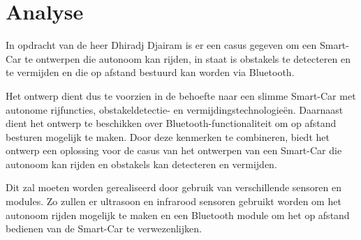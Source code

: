 \section{Analyse}
In opdracht van de heer Dhiradj Djairam is er een casus gegeven om een \gls{Smart-Car} te ontwerpen die \gls{autonoom} kan rijden, in staat is obstakels te detecteren en te vermijden en die op afstand bestuurd kan worden via \gls{Bluetooth}. 

Het ontwerp dient dus te voorzien in de behoefte naar een slimme \gls{Smart-Car} met autonome rijfuncties, obstakeldetectie- en vermijdingstechnologieën. Daarnaast dient het ontwerp te beschikken over \gls{Bluetooth}-functionaliteit om op afstand besturen mogelijk te maken. Door deze kenmerken te combineren, biedt het ontwerp een oplossing voor de casus van het ontwerpen van een \gls{Smart-Car} die \gls{autonoom} kan rijden en obstakels kan detecteren en vermijden.

Dit zal moeten worden gerealiseerd door gebruik van verschillende sensoren en modules. Zo zullen er ultrasoon en infrarood sensoren gebruikt worden om het autonoom rijden mogelijk te maken en een \gls{Bluetooth} module om het op afstand bedienen van de \gls{Smart-Car} te verwezenlijken. 


 
